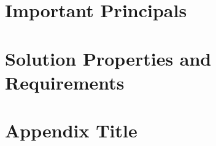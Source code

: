 \documentclass[10pt]{report}
\begin{document}
\chapter{Important Principals}


\chapter{Solution Properties and Requirements}


\appendix
\chapter{Appendix Title}


\fi
\begin{sloppypar}
\printbibliography
\end{sloppypar}
\end{document}
